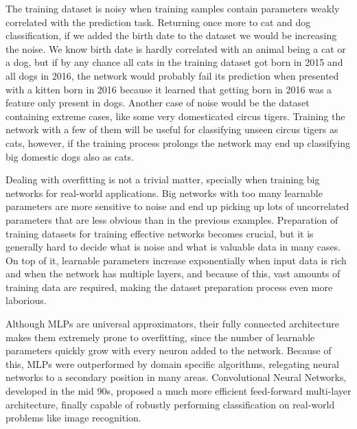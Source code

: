 The training dataset is noisy when training samples contain parameters weakly correlated with the prediction task.
Returning once more to cat and dog classification, if we added the birth date to the dataset we would be increasing the noise.
We know birth date is hardly correlated with an animal being a cat or a dog, but if by any chance all cats in the training dataset got born in 2015 and all dogs in 2016, the network would probably fail its prediction when presented with a kitten born in 2016 because it learned that getting born in 2016 was a feature only present in dogs.
Another case of noise would be the dataset containing extreme cases, like some very domesticated circus tigers.
Training the network with a few of them will be useful for classifying unseen circus tigers as cats, however, if the training process prolongs the network may end up classifying big domestic dogs also as cats.

Dealing with overfitting is not a trivial matter, specially when training big networks for real-world applications.
Big networks with too many learnable parameters are more sensitive to noise and end up picking up lots of uncorrelated parameters that are less obvious than in the previous examples.
Preparation of training datasets for training effective networks becomes crucial, but it is generally hard to decide what is noise and what is valuable data in many cases.
On top of it, learnable parameters increase exponentially when input data is rich and when the network has multiple layers, and because of this, vast amounts of training data are required, making the dataset preparation process even more laborious.

Although MLPs are universal approximators, their fully connected architecture makes them extremely prone to overfitting, since the number of learnable parameters quickly grow with every neuron added to the network.
Because of this, MLPs were outperformed by domain specific algorithms, relegating neural networks to a secondary position in many areas.
Convolutional Neural Networks, developed in the mid 90s, proposed a much more efficient feed-forward multi-layer architecture, finally capable of robustly performing classification on real-world problems like image recognition.



